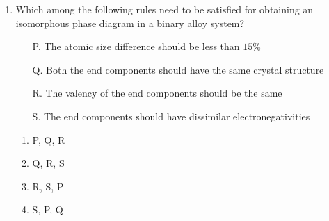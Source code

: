 \documentclass[journal,12pt,onecolumn]{IEEEtran}
\theoremstyle{remark}
\begin{document}
\begin{enumerate}
\begin{center}
\begin{tabular}{| c | c |}
        \hline
           \end{tabular} 
        \end{center}
        
        \hfill{}
        \begin{enumerate}
        \end{enumerate}

    \item Which among the following rules need to be satisfied for obtaining an isomorphous phase diagram
        in a binary alloy system? 
        \begin{enumerate}
            \item[P.] The atomic size difference should be less than $15\%$ 
            \item[Q.] Both the end components should have the same crystal structure
            \item[R.] The valency of the end components should be the same
            \item[S.] The end components should have dissimilar electronegativities
        \end{enumerate}
        \hfill{}
        \begin{multicols}{4}
            \begin{enumerate}
                \item  P, Q, R \columnbreak
                \item  Q, R, S \columnbreak
                \item  R, S, P  \columnbreak
                \item  S, P, Q
            \end{enumerate}
        \end{multicols}



\end{enumerate}
\end{document}

